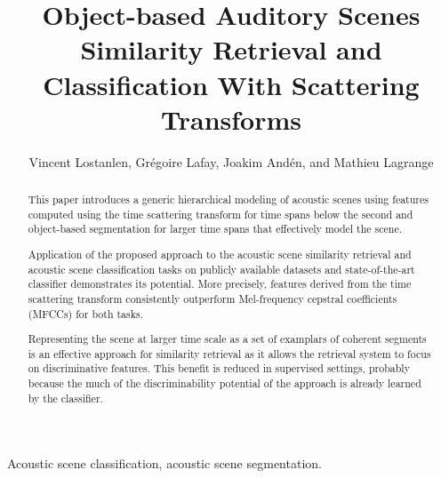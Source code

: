 \documentclass[journal]{IEEEtran}
\begin{document}
%
\title{Object-based Auditory Scenes Similarity Retrieval and Classification With Scattering Transforms}

\author{Vincent Lostanlen, Gr\'egoire Lafay, Joakim And\'en, and Mathieu Lagrange}


\maketitle

\begin{abstract}

This paper introduces a generic hierarchical modeling of acoustic scenes using features computed using the time scattering transform  for time spans below the second and object-based segmentation for larger time spans that effectively model the scene. 

Application of the proposed approach to the acoustic scene similarity retrieval and acoustic scene classification tasks on publicly available datasets and state-of-the-art classifier demonstrates its potential. More precisely, features derived from the time scattering transform consistently outperform Mel-frequency cepstral coefficients (MFCCs) for both tasks. 

Representing the scene at larger time scale as a set of examplars of coherent segments is an effective approach for similarity retrieval as it allows the retrieval system to focus on discriminative features. This benefit is reduced in supervised settings, probably because the much of the discriminability potential of the approach is already learned by the classifier.

\end{abstract}

\begin{IEEEkeywords}
Acoustic scene classification, acoustic scene segmentation.
\end{IEEEkeywords}

%
\IEEEpeerreviewmaketitle
\end{document}
